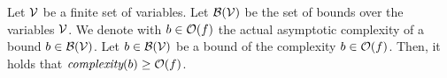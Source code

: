 \begin{theorem}
  Let $\mathcal{V}$ be a finite set of variables.
  Let $\mathcal{B}(\mathcal{V})$ be the set of bounds over the variables $\mathcal{V}$.
  We denote with $b \in \mathcal{O}(f)$ the actual asymptotic complexity of a bound $b \in \mathcal{B}(\mathcal{V})$.
  Let $b \in \mathcal{B}(\mathcal{V})$ be a bound of the complexity $b \in \mathcal{O}(f)$.
  Then, it holds that $\emph{complexity}(b) \geq \mathcal{O}(f)$.
\end{theorem}
